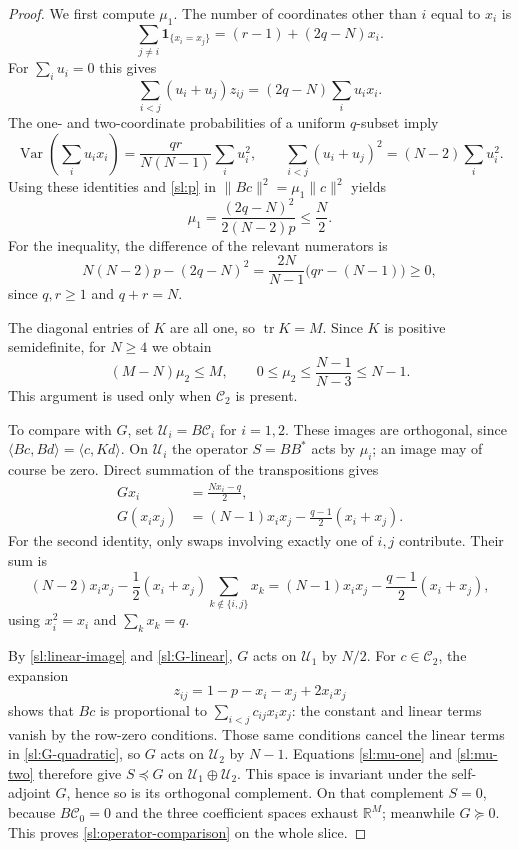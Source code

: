 \begin{proof}
We first compute $\mu_1$. The number of coordinates other than $i$ equal
to $x_i$ is
\[
 \sum_{j\ne i}\mathbf 1_{\{x_i=x_j\}}
   =(r-1)+(2q-N)x_i.
\]
For $\sum_i u_i=0$ this gives
\begin{equation}
 \sum_{i<j}(u_i+u_j)z_{ij}
       =(2q-N)\sum_i u_i x_i.
 \label{sl:linear-image}
\end{equation}
The one- and two-coordinate probabilities of a uniform $q$-subset imply
\[
 \operatorname{Var}\!\left(\sum_i u_i x_i\right)
    =\frac{qr}{N(N-1)}\sum_i u_i^2,
 \qquad
 \sum_{i<j}(u_i+u_j)^2=(N-2)\sum_i u_i^2.
\]
Using these identities and \eqref{sl:p} in
$\|Bc\|^2=\mu_1\|c\|^2$ yields
\begin{equation}
 \mu_1=\frac{(2q-N)^2}{2(N-2)p}\le\frac N2.
 \label{sl:mu-one}
\end{equation}
For the inequality, the difference of the relevant numerators is
\[
 N(N-2)p-(2q-N)^2
   =\frac{2N}{N-1}\bigl(qr-(N-1)\bigr)\ge0,
\]
since $q,r\ge1$ and $q+r=N$.

The diagonal entries of $K$ are all one, so $\operatorname{tr}K=M$.
Since $K$ is positive semidefinite, for $N\ge4$ we obtain
\begin{equation}
 (M-N)\mu_2\le M,
 \qquad
 0\le\mu_2\le\frac{N-1}{N-3}\le N-1.
 \label{sl:mu-two}
\end{equation}
This argument is used only when $\mathcal C_2$ is present.

To compare with $G$, set $\mathcal U_i=B\mathcal C_i$ for $i=1,2$.
These images are orthogonal, since
$\langle Bc,Bd\rangle=\langle c,Kd\rangle$. On $\mathcal U_i$ the operator
$S=BB^*$ acts by $\mu_i$; an image may of course be zero. Direct summation
of the transpositions gives
\begin{align}
 Gx_i&=\frac{Nx_i-q}{2},\label{sl:G-linear}\\
 G(x_ix_j)&=(N-1)x_ix_j-\frac{q-1}{2}(x_i+x_j).
 \label{sl:G-quadratic}
\end{align}
For the second identity, only swaps involving exactly one of $i,j$
contribute. Their sum is
\[
 (N-2)x_ix_j-\frac12(x_i+x_j)\sum_{k\notin\{i,j\}}x_k
 =(N-1)x_ix_j-\frac{q-1}{2}(x_i+x_j),
\]
using $x_i^2=x_i$ and $\sum_kx_k=q$.

By \eqref{sl:linear-image} and \eqref{sl:G-linear}, $G$ acts on
$\mathcal U_1$ by $N/2$. For $c\in\mathcal C_2$, the expansion
\[
 z_{ij}=1-p-x_i-x_j+2x_ix_j
\]
shows that $Bc$ is proportional to $\sum_{i<j}c_{ij}x_ix_j$: the constant
and linear terms vanish by the row-zero conditions. Those same conditions
cancel the linear terms in \eqref{sl:G-quadratic}, so $G$ acts on
$\mathcal U_2$ by $N-1$. Equations \eqref{sl:mu-one} and
\eqref{sl:mu-two} therefore give $S\preceq G$ on
$\mathcal U_1\oplus\mathcal U_2$. This space is invariant under the
self-adjoint $G$, hence so is its orthogonal complement. On that complement
$S=0$, because $B\mathcal C_0=0$ and the three coefficient spaces exhaust
$\mathbb R^M$; meanwhile $G\succeq0$. This proves
\eqref{sl:operator-comparison} on the whole slice.


\end{proof}
